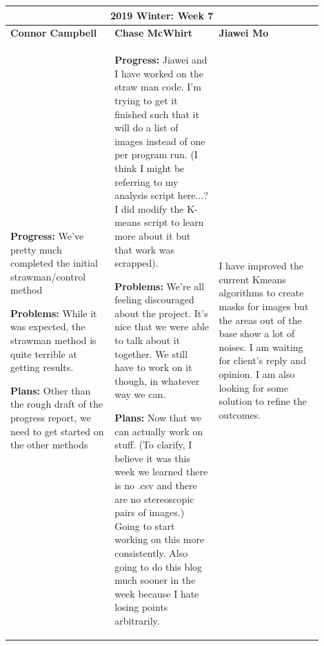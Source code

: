 \documentclass[10pt,journal,compsoc, draftclsnofoot,onecolumn]{IEEEtran}
\begin{document}
\begin{center}
\begin{tabular}{|p{0.3\linewidth}|p{0.3\linewidth}|p{0.3\linewidth}|}
\hline
\multicolumn{3}{|c|}{\textbf{2019 Winter: Week 7}} \\
\hline
\textbf{Connor Campbell} & \textbf{Chase McWhirt} & \textbf{Jiawei Mo} \\ [0.5ex]
\hline\hline

\textbf{Progress:} We've pretty much completed the initial strawman/control method

\textbf{Problems:} While it was expected, the strawman method is quite terrible at getting results.

\textbf{Plans:} Other than the rough draft of the progress report, we need to get started on the other methods
&
\textbf{Progress:} Jiawei and I have worked on the straw man code.
I'm trying to get it finished such that it will do a list of images instead of one per program run.
(I think I might be referring to my analysis script here...?
I did modify the K-means script to learn more about it but that work was scrapped).

\textbf{Problems:} We're all feeling discouraged about the project.
It's nice that we were able to talk about it together.
We still have to work on it though, in whatever way we can.

\textbf{Plans:} Now that we can actually work on stuff.
(To clarify, I believe it was this week we learned there is no .csv and there are no stereoscopic pairs of images.)
Going to start working on this more consistently.
Also going to do this blog much sooner in the week because I hate losing points arbitrarily.
&
I have improved the current Kmeans algorithms to create masks for images but the areas out of the base show a lot of noises. I am waiting for client's reply and opinion. I am also looking for some solution to refine the outcomes.
\\ \hline
\end{tabular}
\end{center}
\end{document}
